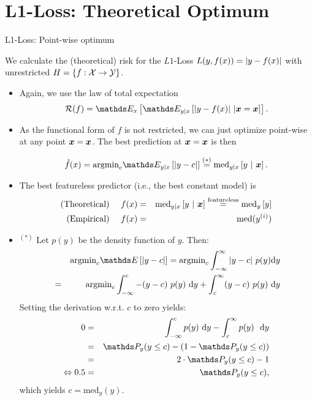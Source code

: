 \section{L1-Loss: Theoretical Optimum}


\begin{vbframe}{L1-Loss: Point-wise optimum}

We calculate the (theoretical) risk for the $L1$-Loss $L(y, f(x)) = \left|y-f(x)\right|$ with unrestricted $H = \{f: \mathcal{X} \to \mathcal{Y}\}$. 

\begin{itemize}
  \item Again, we use the law of total expectation 
  $$
    \riskf = \E_x \left[\E_{y|x}\left[|y-\fx|~|\xv = \xv\right]\right]. 
  $$
  \item As the functional form of $f$ is not restricted, we can just optimize point-wise at any point $\bm{x} = \bm{x}$. The best prediction at $\bm{x} = \bm{x}$ is then 

  $$
    \fxh = \mbox{argmin}_c \E_{y|x}\left[|y - c|\right]\overset{(*)}{=} \text{med}_{y|x} \left[y ~|~ \xv \right]. 
  $$
\item The best featureless predictor (i.e., the best constant model) is
\begin{eqnarray*}
  \text{(Theoretical) \quad}f(x) &=& \text{med}_{y|x} \left[y ~|~ \bm{x} \right] \overset{\text{featureless}}{=}  \text{med}_{y} \left[y \right] \\
  \text{(Empirical) \quad}f(x) &=& \text{med}(y^{(i)})
\end{eqnarray*} 


  \framebreak 

  \item $^{(*)}$ Let $p(y)$ be the density function of $y$. Then: 
  \begin{eqnarray*}
  && \mbox{argmin}_c \E\left[|y - c|\right] = \mbox{argmin}_c \int_{-\infty}^\infty |y - c| ~ p(y) \text{d}y \\
  &=& \mbox{argmin}_c \int_{-\infty}^c -(y - c)~p(y)~\text{d}y + \int_c^\infty (y - c)~p(y)~\text{d}y 
  \end{eqnarray*}
  Setting the derivation w.r.t. $c$ to zero yields: 
  \begin{eqnarray*}
  0 &=& \int_{-\infty}^c p(y)~\text{d}y - \int_c^\infty p(y)~~\text{d}y \\
  &=& \P_y (y \le c) - \left(1 - \P_y (y \le c)\right)\\
  &=& 2 \cdot \P_y (y \le c) - 1 \\
  \Leftrightarrow 0.5 &=& \P_y (y \le c),
  \end{eqnarray*}
  which yields $c = \text{med}_y(y)$.  



\end{itemize}

\end{vbframe}


